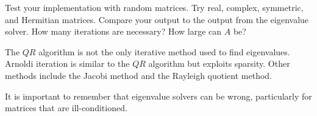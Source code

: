 \begin{comment}

\begin{problem}
If $A$ is normal, its Schur form is diagonal.
For normal $A$, have your function additionally output the eigenvector corresponding to each eigenvalue.
Hint 1: Test your function on Hermitian and real symmetric matrices; they are both normal.
Hint 2: Your work in Problem \ref{problem:similarity proof} will help.
You have already made all the necessary calculations, you just need to store the information correctly.
\end{problem}

\end{comment}

\begin{problem}
Test your implementation with random matrices.
Try real, complex, symmetric, and Hermitian matrices.
Compare your output to the output from the eigenvalue solver.
How many iterations are necessary?
How large can $A$ be?
\end{problem}

The $QR$ algorithm is not the only iterative method used to find eigenvalues.
Arnoldi iteration is similar to the $QR$ algorithm but exploits sparsity.
Other methods include the Jacobi method and the Rayleigh quotient method.

It is important to remember that eigenvalue solvers can be wrong, particularly for matrices that are ill-conditioned.